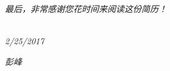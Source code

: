 \documentclass[]{friggeri-cv}
\begin{document}
\emph{
最后，非常感谢您花时间来阅读这份简历！\\}
~
\begin{flushleft}
\emph{2/25/2017}
\end{flushleft}
\begin{flushright}
\emph{彭峰}
\end{flushright}
\end{document}
